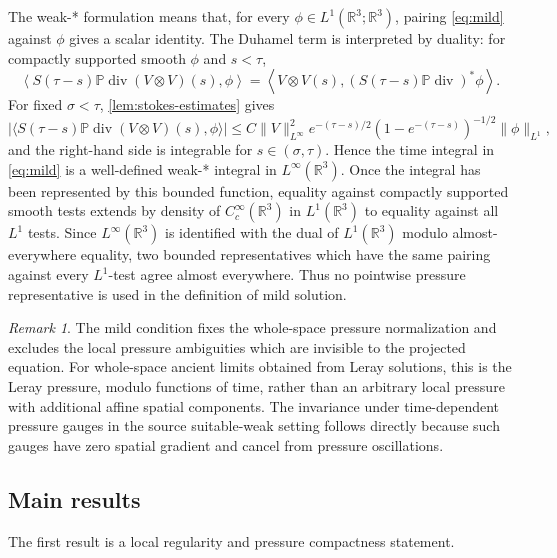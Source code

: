 \documentclass[11pt]{amsart}
\theoremstyle{plain}
\theoremstyle{definition}
\theoremstyle{remark}
\newtheorem{remark}[theorem]{Remark}
\numberwithin{equation}{section}
\begin{document}
The weak-* formulation means that, for every
\(\phi\in L^1(\mathbb R^3;\mathbb R^3)\), pairing \eqref{eq:mild} against
\(\phi\) gives a scalar identity.  The Duhamel term is interpreted by duality:
for compactly supported smooth \(\phi\) and \(s<\tau\),
\[
   \left\langle
      S(\tau-s)\mathbb P\operatorname{div}(V\otimes V)(s),\phi
   \right\rangle
   =
   \left\langle
      V\otimes V(s),
      (S(\tau-s)\mathbb P\operatorname{div})^*\phi
   \right\rangle .
\]
For fixed \(\sigma<\tau\), \cref{lem:stokes-estimates} gives
\[
   \bigl|
      \langle
      S(\tau-s)\mathbb P\operatorname{div}(V\otimes V)(s),\phi
      \rangle
   \bigr|
   \le
   C\|V\|_{L^\infty}^2
   e^{-(\tau-s)/2}(1-e^{-(\tau-s)})^{-1/2}\|\phi\|_{L^1},
\]
and the right-hand side is integrable for \(s\in(\sigma,\tau)\).  Hence the
time integral in \eqref{eq:mild} is a well-defined weak-* integral in
\(L^\infty(\mathbb R^3)\).  Once the integral has been represented by this
bounded function, equality against compactly supported smooth tests extends
by density of \(C_c^\infty(\mathbb R^3)\) in \(L^1(\mathbb R^3)\) to equality
against all \(L^1\) tests.  Since \(L^\infty(\mathbb R^3)\) is identified
with the dual of \(L^1(\mathbb R^3)\) modulo almost-everywhere equality, two
bounded representatives which have the same pairing against every
\(L^1\)-test agree almost everywhere.  Thus no pointwise pressure
representative is used in the definition of mild solution.

\begin{remark}
The mild condition fixes the whole-space pressure normalization and excludes
the local pressure ambiguities which are invisible to the projected equation.
For whole-space ancient limits obtained from Leray solutions, this is the
Leray pressure, modulo functions of time, rather than an arbitrary local
pressure with additional affine spatial components.  The invariance under
time-dependent pressure gauges in the source suitable-weak setting follows
directly because such gauges have zero spatial gradient and cancel from
pressure oscillations.
\end{remark}

\subsection{Main results}

The first result is a local regularity and pressure compactness statement.
\end{document}
